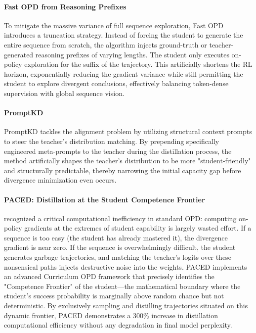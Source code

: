 \documentclass{article} %
\begin{document}
\paragraph{Fast OPD from Reasoning Prefixes}
To mitigate the massive variance of full sequence exploration, Fast OPD \citep{2602.15260} introduces a truncation strategy. Instead of forcing the student to generate the entire sequence from scratch, the algorithm injects ground-truth or teacher-generated reasoning prefixes of varying lengths. The student only executes on-policy exploration for the suffix of the trajectory. This artificially shortens the RL horizon, exponentially reducing the gradient variance while still permitting the student to explore divergent conclusions, effectively balancing token-dense supervision with global sequence vision.

\paragraph{PromptKD}
PromptKD \citep{2402.12842} tackles the alignment problem by utilizing structural context prompts to steer the teacher's distribution matching. By prepending specifically engineered meta-prompts to the teacher during the distillation process, the method artificially shapes the teacher's distribution to be more "student-friendly" and structurally predictable, thereby narrowing the initial capacity gap before divergence minimization even occurs.

\paragraph{PACED: Distillation at the Student Competence Frontier}
\citet{2603.11178} recognized a critical computational inefficiency in standard OPD: computing on-policy gradients at the extremes of student capability is largely wasted effort. If a sequence is too easy (the student has already mastered it), the divergence gradient is near zero. If the sequence is overwhelmingly difficult, the student generates garbage trajectories, and matching the teacher's logits over these nonsensical paths injects destructive noise into the weights. PACED implements an advanced Curriculum OPD framework that precisely identifies the "Competence Frontier" of the student—the mathematical boundary where the student's success probability is marginally above random chance but not deterministic. By exclusively sampling and distilling trajectories situated on this dynamic frontier, PACED demonstrates a 300\% increase in distillation computational efficiency without any degradation in final model perplexity.
\end{document}
